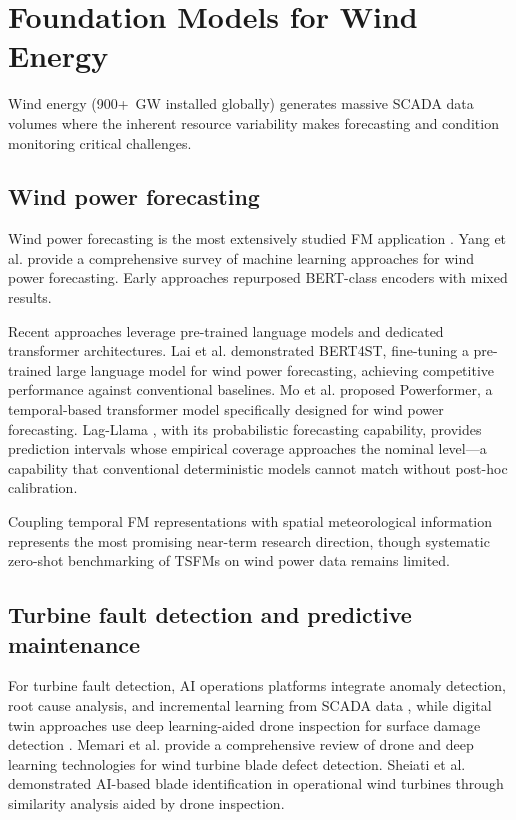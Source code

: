\documentclass[preprint,12pt]{elsarticle}
\begin{document}
\section{Foundation Models for Wind Energy}
\label{sec:wind}

Wind energy (900+~GW installed globally) generates massive SCADA data volumes where the inherent resource variability makes forecasting and condition monitoring critical challenges.

\subsection{Wind power forecasting}
\label{subsec:wind_forecasting}

Wind power forecasting is the most extensively studied FM application \cite{lai2024bert4st, mo2024powerformer, yang2024survey_wind_ml}. Yang et al. \cite{yang2024survey_wind_ml} provide a comprehensive survey of machine learning approaches for wind power forecasting. Early approaches repurposed BERT-class encoders with mixed results.

Recent approaches leverage pre-trained language models and dedicated transformer architectures. Lai et al. \cite{lai2024bert4st} demonstrated BERT4ST, fine-tuning a pre-trained large language model for wind power forecasting, achieving competitive performance against conventional baselines. Mo et al. \cite{mo2024powerformer} proposed Powerformer, a temporal-based transformer model specifically designed for wind power forecasting. Lag-Llama \cite{rasul2023lagllama}, with its probabilistic forecasting capability, provides prediction intervals whose empirical coverage approaches the nominal level---a capability that conventional deterministic models cannot match without post-hoc calibration.

Coupling temporal FM representations with spatial meteorological information represents the most promising near-term research direction, though systematic zero-shot benchmarking of TSFMs on wind power data remains limited.

\subsection{Turbine fault detection and predictive maintenance}
\label{subsec:wind_fault}

For turbine fault detection, AI operations platforms integrate anomaly detection, root cause analysis, and incremental learning from SCADA data \cite{zhang2024aiops_wind_turbine}, while digital twin approaches use deep learning-aided drone inspection for surface damage detection \cite{hu2025digital_twin_blade}. Memari et al. \cite{memari2024blade_inspection_review} provide a comprehensive review of drone and deep learning technologies for wind turbine blade defect detection. Sheiati et al. \cite{sheiati2024blade_identification} demonstrated AI-based blade identification in operational wind turbines through similarity analysis aided by drone inspection.
\end{document}
